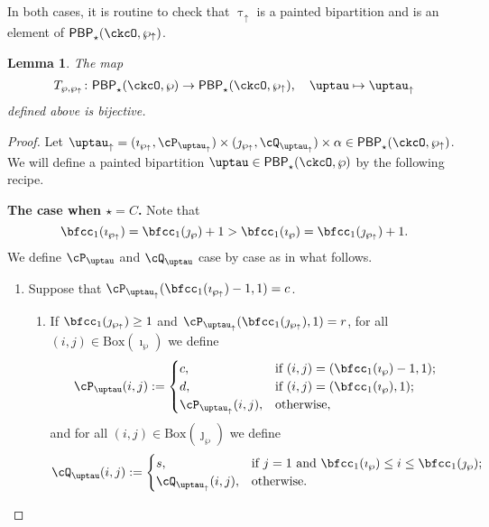 \documentclass[12pt]{amsart}
\def\ttau{\tilde{\tau}}
\numberwithin{equation}{section}
\newtheorem{lem}[thm]{Lemma}
\theoremstyle{remark}
\def\BOX#1{\mathrm{Box}(#1)}
\def\CPPs{\mathrm{PP}_{\star}}
\def\PBP{\mathsf{PBP}}
\def\PBPop#1#2#3#4{\PBP_{#1}^{#2}(#3,#4)}
\newcommand{\PBPOP}[1][]{\PBPop{\star}{#1}{\ckcO}{\wp}}
\def\wpu{\wp_{\uparrow}}
\def\wpd{\wp} %
\def\uptauu{\uptau_{\uparrow}}
\def\uptaud{\uptau} %
\begin{document}

In both cases, it is routine to check that $\uptauu$ is a painted
bipartition and is an element of $\PBPop{\star}{}{\ckcO}{\wpu}$.

\begin{lem}\label{lem:sn}
 The map
  \[
    T_{\wp,\wpu}\colon \PBPOP \rightarrow
    \PBPop{\star}{}{\ckcO}{\wpu}, \quad \uptau \mapsto \uptauu
  \]
  defined above is bijective.
\end{lem}
\begin{proof}
  Let $\uptauu = (\imath_{\wpu}, \cP_{\uptauu})\times (\jmath_{\wpu},\cQ_{\uptauu})\times \alpha \in\PBPop{\star}{}{\ckcO}{\wpu}$. We will define a painted bipartition $\uptaud\in \PBPOP$ by the following recipe.



  \medskip

  {\bfseries The case when $\star = C$.}
  Note that $$\bfcc_1(\imath_{\wpu})= \bfcc_1(\jmath_{\wp})+1>  \bfcc_1(\imath_\wp)= \bfcc_1(\jmath_{\wpu})+1.$$
  We define $\cP_{\uptaud}$ and $\cQ_{\uptaud}$  case by case as in what follows.
 \begin{enumerate}[label=(\alph*)]
   \item Suppose that
   $\cP_{\uptauu}(\bfcc_{1}(\imath_{\wpu})-1,1)=c$.
   \begin{enumerate}[label={\localtextbulletone}]
     \item
           If $\bfcc_{1}(\jmath_{\wpu})\geq 1$ and
           $\cP_{\uptauu}(\bfcc_{1}(\jmath_{\wpu}),1) = r$,
         for all $(i,j)\in \BOX{\imath_{\wpd}}$  we define
          \[
       \cP_{\uptaud}(i,j) := \begin{cases}
         c ,& \text{if $(i,j)=(\bfcc_{1}(\imath_{\wpd})-1,1)$};\\
         d ,& \text{if $(i,j)=(\bfcc_{1}(\imath_{\wpd}),1)$};\\
         \cP_{\uptauu}(i,j) ,&\text{otherwise},
       \end{cases}
     \]
     and for all $(i,j)\in \BOX{\jmath_{\wpd}}$ we define
     \[
       \cQ_{\uptaud}(i,j) := \begin{cases}
         s ,& \text{if $j=1$ and $\bfcc_{1}(\imath_{\wpd})\leq i \leq \bfcc_{1}(\jmath_{\wpd})$};\\
         \cQ_{\uptauu}(i,j), &\text{otherwise}.
       \end{cases}
     \]


\end{enumerate}
\end{enumerate}
\end{proof}
\end{document}
